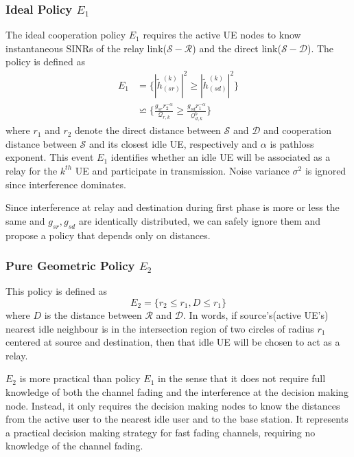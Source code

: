 \documentclass[titlepage]{article}
\begin{document}
\subsubsection{Ideal Policy $E_1$}
The ideal cooperation policy $E_1$ requires the active UE nodes to know instantaneous  SINRs of the relay link($\mathcal{S}-\mathcal{R}$) and the
direct link($\mathcal{S}-\mathcal{D}$). The policy is defined as 
\begin{align*}
E_1 &= \Big\{|\tilde{h}_{(sr)}^{(k)}|^2 \geq |\tilde{h}_{(sd)}^{(k)}|^2\Big\} \\
&\backsimeq \Big\{ \frac{g_{sr}r_2^{-\alpha}}{\mathcal{Q}_{r,k}} \geq \frac{g_{sd}r_1^{-\alpha}}{\mathcal{Q}_{d,k}^b} \Big\}
\end{align*}
where $r_1$ and $r_2$ denote the direct distance
between $\mathcal{S}$ and $\mathcal{D}$ and cooperation distance between $\mathcal{S}$ and its closest idle UE, respectively and $\alpha$ is pathloss exponent. This event $E_1$ identifies whether an idle UE will be associated as a relay for the $k^{th}$ UE and participate in transmission. Noise variance $\sigma^2$ is ignored since interference dominates. 
\par Since interference at relay and destination during first phase is more or less the same and $g_{sr}, g_{sd}$ are identically distributed, we can safely ignore them and propose a policy that depends only on distances.

\subsubsection{Pure Geometric Policy $E_2$}
This policy is defined as
\begin{equation}
E_2 = \{r_2\leq r_1, D \leq r_1 \}
\end{equation}
where $D$ is the distance between $\mathcal{R}$ and $\mathcal{D}$. In words, if source's(active UE's) nearest idle neighbour is in the intersection region of two circles of radius $r_1$ centered at source and destination, then that idle UE will be chosen to act as a relay.
\par $E_2$ is more practical than policy $E_1$ in the sense that
it does not require full knowledge of both the channel fading
and the interference at the decision making node. Instead, it
only requires the decision making nodes to know the distances
from the active user to the nearest idle user and to the base
station. It represents a practical decision making strategy for
fast fading channels, requiring no knowledge of the channel
fading. 
\end{document}
